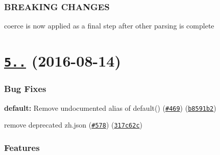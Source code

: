 \subsubsection*{B\+R\+E\+A\+K\+I\+NG C\+H\+A\+N\+G\+ES}


\begin{DoxyItemize}
\item coerce is now applied as a final step after other parsing is complete
\end{DoxyItemize}

\label{_5.0.0}%
 \section*{\href{https://github.com/yargs/yargs/compare/v4.8.1...v5.0.0}{\tt 5..} (2016-\/08-\/14)}

\subsubsection*{Bug Fixes}


\begin{DoxyItemize}
\item {\bfseries default\+:} Remove undocumented alias of default() (\href{https://github.com/yargs/yargs/issues/469}{\tt \#469}) (\href{https://github.com/yargs/yargs/commit/b8591b2}{\tt b8591b2})
\item remove deprecated zh.\+json (\href{https://github.com/yargs/yargs/issues/578}{\tt \#578}) (\href{https://github.com/yargs/yargs/commit/317c62c}{\tt 317c62c})
\end{DoxyItemize}

\subsubsection*{Features}



